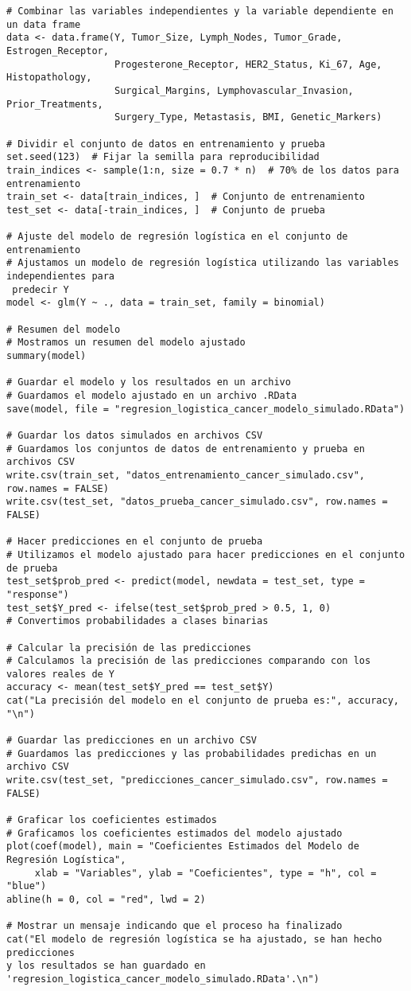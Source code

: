 \begin{verbatim}
# Combinar las variables independientes y la variable dependiente en un data frame
data <- data.frame(Y, Tumor_Size, Lymph_Nodes, Tumor_Grade, Estrogen_Receptor, 
                   Progesterone_Receptor, HER2_Status, Ki_67, Age, Histopathology,
                   Surgical_Margins, Lymphovascular_Invasion, Prior_Treatments,
                   Surgery_Type, Metastasis, BMI, Genetic_Markers)

# Dividir el conjunto de datos en entrenamiento y prueba
set.seed(123)  # Fijar la semilla para reproducibilidad
train_indices <- sample(1:n, size = 0.7 * n)  # 70% de los datos para entrenamiento
train_set <- data[train_indices, ]  # Conjunto de entrenamiento
test_set <- data[-train_indices, ]  # Conjunto de prueba

# Ajuste del modelo de regresión logística en el conjunto de entrenamiento
# Ajustamos un modelo de regresión logística utilizando las variables independientes para
 predecir Y
model <- glm(Y ~ ., data = train_set, family = binomial)

# Resumen del modelo
# Mostramos un resumen del modelo ajustado
summary(model)

# Guardar el modelo y los resultados en un archivo
# Guardamos el modelo ajustado en un archivo .RData
save(model, file = "regresion_logistica_cancer_modelo_simulado.RData")

# Guardar los datos simulados en archivos CSV
# Guardamos los conjuntos de datos de entrenamiento y prueba en archivos CSV
write.csv(train_set, "datos_entrenamiento_cancer_simulado.csv", row.names = FALSE)
write.csv(test_set, "datos_prueba_cancer_simulado.csv", row.names = FALSE)

# Hacer predicciones en el conjunto de prueba
# Utilizamos el modelo ajustado para hacer predicciones en el conjunto de prueba
test_set$prob_pred <- predict(model, newdata = test_set, type = "response")
test_set$Y_pred <- ifelse(test_set$prob_pred > 0.5, 1, 0)  
# Convertimos probabilidades a clases binarias

# Calcular la precisión de las predicciones
# Calculamos la precisión de las predicciones comparando con los valores reales de Y
accuracy <- mean(test_set$Y_pred == test_set$Y)
cat("La precisión del modelo en el conjunto de prueba es:", accuracy, "\n")

# Guardar las predicciones en un archivo CSV
# Guardamos las predicciones y las probabilidades predichas en un archivo CSV
write.csv(test_set, "predicciones_cancer_simulado.csv", row.names = FALSE)

# Graficar los coeficientes estimados
# Graficamos los coeficientes estimados del modelo ajustado
plot(coef(model), main = "Coeficientes Estimados del Modelo de Regresión Logística", 
     xlab = "Variables", ylab = "Coeficientes", type = "h", col = "blue")
abline(h = 0, col = "red", lwd = 2)

# Mostrar un mensaje indicando que el proceso ha finalizado
cat("El modelo de regresión logística se ha ajustado, se han hecho predicciones 
y los resultados se han guardado en 'regresion_logistica_cancer_modelo_simulado.RData'.\n")
\end{verbatim}